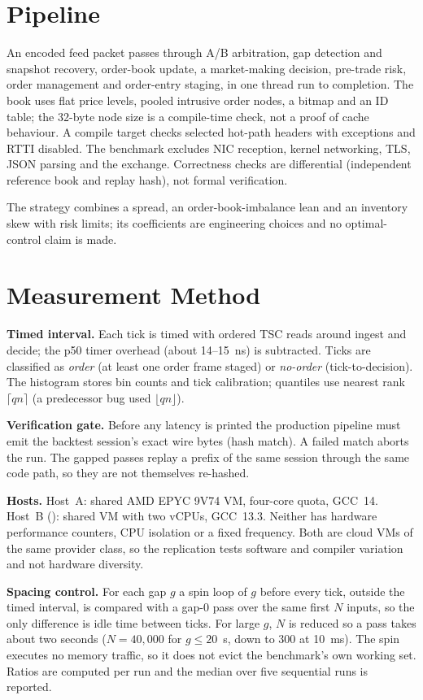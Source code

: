 \documentclass[conference]{IEEEtran}
\begin{document}
\section{Pipeline}
An encoded feed packet passes through A/B arbitration, gap detection and snapshot recovery, order-book update, a market-making decision, pre-trade risk, order management and order-entry staging, in one thread run to completion. The book uses flat price levels, pooled intrusive order nodes, a bitmap and an ID table; the 32-byte node size is a compile-time check, not a proof of cache behaviour. A compile target checks selected hot-path headers with exceptions and RTTI disabled. The benchmark excludes NIC reception, kernel networking, TLS, JSON parsing and the exchange. Correctness checks are differential (independent reference book and replay hash), not formal verification.

The strategy combines a spread, an order-book-imbalance lean and an inventory skew with risk limits; its coefficients are engineering choices and no optimal-control claim is made.

\section{Measurement Method}
\textbf{Timed interval.} Each tick is timed with ordered TSC reads around ingest and decide; the p50 timer overhead (about 14--15~ns) is subtracted. Ticks are classified as \emph{order} (at least one order frame staged) or \emph{no-order} (tick-to-decision). The histogram stores bin counts and tick calibration; quantiles use nearest rank $\lceil qn\rceil$ (a predecessor bug used $\lfloor qn\rfloor$).

\textbf{Verification gate.} Before any latency is printed the production pipeline must emit the backtest session's exact wire bytes (hash match). A failed match aborts the run. The gapped passes replay a prefix of the same session through the same code path, so they are not themselves re-hashed.

\textbf{Hosts.} Host~A: shared AMD EPYC 9V74 VM, four-core quota, GCC~14. Host~B (\HostBCpu): shared VM with two vCPUs, GCC~13.3. Neither has hardware performance counters, CPU isolation or a fixed frequency. Both are cloud VMs of the same provider class, so the replication tests software and compiler variation and not hardware diversity.

\textbf{Spacing control.} For each gap $g$ a spin loop of $g$ before every tick, outside the timed interval, is compared with a gap-0 pass over the same first $N$ inputs, so the only difference is idle time between ticks. For large $g$, $N$ is reduced so a pass takes about two seconds ($N=40{,}000$ for $g\le20$~\textmu s, down to $300$ at 10~ms). The spin executes no memory traffic, so it does not evict the benchmark's own working set. Ratios are computed per run and the median over five sequential runs is reported.
\end{document}
